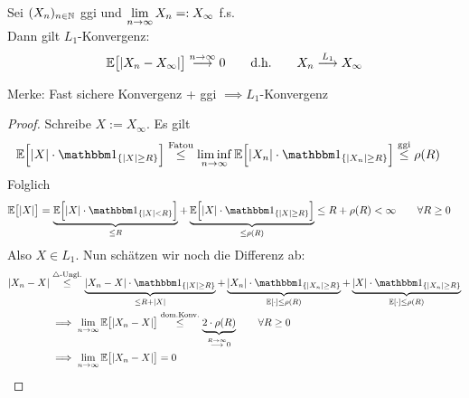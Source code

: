 \begin{theorem}\label{theorem4.5}
Sei $(X_n)_{n\in\mathbb{N}}$ ggi und $\lim\limits_{n\to\infty} X_n=:X_\infty$ f.s.\\
Dann gilt $L_1$-Konvergenz:
\begin{align*}
\mathbb{E}\big[|X_n-X_\infty|\big]\stackrel{n\to\infty}{\longrightarrow}0
\qquad\text{d.h.}\qquad
X_n\stackrel{L_1}{\longrightarrow} X_\infty
\end{align*}
\end{theorem}
\begin{bemerkung}
Merke: Fast sichere Konvergenz + ggi $\implies L_1$-Konvergenz
\end{bemerkung}
\begin{proof}
Schreibe $X:=X_\infty$. Es gilt
\begin{align*}
\E\Big[|X|\cdot\indi_{\lbrace |X|\geq R\rbrace}\Big]
&\stackrel{\text{Fatou}}{\leq}
\liminf\limits_{n\to\infty}\E\Big[|X_n|\cdot\indi_{\lbrace |X_n|\geq R\rbrace}\Big]
\stackrel{\text{ggi}}{\leq}
\rho(R)
\end{align*}
Folglich
\begin{align*}
\E\big[|X|\big]&=\underbrace{\E\Big[|X|\cdot\indi_{\lbrace |X|< R\rbrace}\Big]}_{\leq R}+\underbrace{\E\Big[|X|\cdot\indi_{\lbrace |X|\geq R\rbrace}\Big]}_{\leq\rho(R)}
\leq R+\rho(R)<\infty\qquad\forall R\geq0
\end{align*}
Also $X\in L_1$. Nun schätzen wir noch die Differenz ab:
\begin{align*}
|X_n-X|
&\stackrel{\triangle\text{-Ungl.}}{\leq}
\underbrace{|X_n-X|\cdot\indi_{\lbrace |X|\geq R\rbrace}}_{\leq R+|X|}+\underbrace{|X_n|\cdot\indi_{\lbrace |X_n|\geq R\rbrace}}_{\E[\cdot]\leq\rho(R)}+\underbrace{|X|\cdot\indi_{\lbrace |X_n|\geq R\rbrace}}_{\E[\cdot]\leq\rho(R)}\\
&\implies
\limn\E\big[|X_n-X|\big]
\stackrel{\text{dom.Konv.}}{\leq}
\underbrace{2\cdot\rho(R)}_{\stackrel{R\to\infty}{\longrightarrow}0}\qquad\forall R\geq0\\
&\implies\limn\E\big[|X_n-X|\big]=0
\end{align*}
\end{proof}

